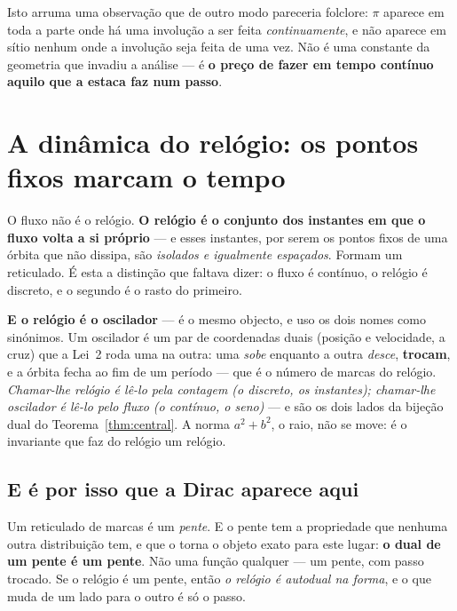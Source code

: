 \documentclass[livro.tex]{subfiles}
\begin{document}
\medskip
\noindent Isto arruma uma observação que de outro modo pareceria folclore: $\pi$ aparece em toda a
parte onde há uma involução a ser feita \emph{continuamente}, e não aparece em sítio nenhum onde a
involução seja feita de uma vez. Não é uma constante da geometria que invadiu a análise --- é
\textbf{o preço de fazer em tempo contínuo aquilo que a estaca faz num passo}.


\section{A dinâmica do relógio: os pontos fixos marcam o tempo}\label{sec:relogio}

\noindent O fluxo não é o relógio. \textbf{O relógio é o conjunto dos instantes em que o fluxo
volta a si próprio} --- e esses instantes, por serem os pontos fixos de uma órbita que não
dissipa, são \emph{isolados e igualmente espaçados}. Formam um reticulado. É esta a distinção que
faltava dizer: o fluxo é contínuo, o relógio é discreto, e o segundo é o rasto do primeiro.

\smallskip
\noindent \textbf{E o relógio é o oscilador} --- é o mesmo objecto, e uso os dois nomes como
sinónimos. Um oscilador é um par de coordenadas duais (posição e velocidade, a cruz) que a Lei~2 roda
uma na outra: uma \emph{sobe} enquanto a outra \emph{desce}, \textbf{trocam}, e a órbita fecha ao fim
de um período --- que é o número de marcas do relógio. \emph{Chamar-lhe relógio é lê-lo pela contagem
(o discreto, os instantes); chamar-lhe oscilador é lê-lo pelo fluxo (o contínuo, o seno)} --- e são os
dois lados da bijeção dual do Teorema~\ref{thm:central}. A norma $a^2+b^2$, o raio, não se move: é o
invariante que faz do relógio um relógio.

\subsection{E é por isso que a Dirac aparece aqui}\label{sec:dirac}

\noindent Um reticulado de marcas é um \emph{pente}. E o pente tem a propriedade que nenhuma outra
distribuição tem, e que o torna o objeto exato para este lugar: \textbf{o dual de um pente é um
pente}. Não uma função qualquer --- um pente, com passo trocado. Se o relógio é um pente, então
\emph{o relógio é autodual na forma}, e o que muda de um lado para o outro é só o passo.

\end{document}
